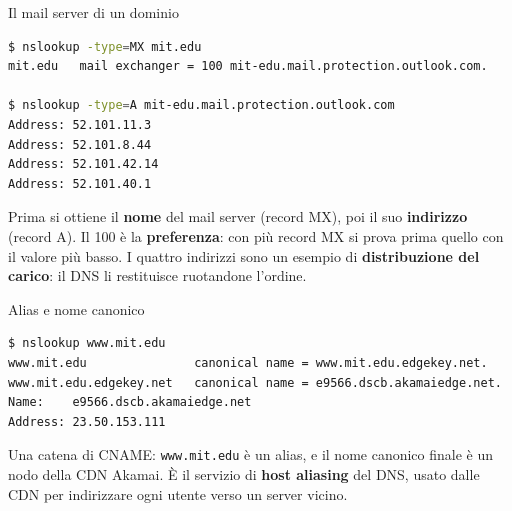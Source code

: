 
\begin{esempio}{Il mail server di un dominio}
\begin{lstlisting}[language=bash]
$ nslookup -type=MX mit.edu
mit.edu   mail exchanger = 100 mit-edu.mail.protection.outlook.com.

$ nslookup -type=A mit-edu.mail.protection.outlook.com
Address: 52.101.11.3
Address: 52.101.8.44
Address: 52.101.42.14
Address: 52.101.40.1
\end{lstlisting}
Prima si ottiene il \textbf{nome} del mail server (record MX), poi il suo \textbf{indirizzo} (record A). Il 100 è la
\textbf{preferenza}: con più record MX si prova prima quello con il valore più basso. I quattro indirizzi sono un esempio di
\textbf{distribuzione del carico}: il DNS li restituisce ruotandone l'ordine.
\end{esempio}

\begin{esempio}{Alias e nome canonico}
\begin{lstlisting}[language=bash]
$ nslookup www.mit.edu
www.mit.edu               canonical name = www.mit.edu.edgekey.net.
www.mit.edu.edgekey.net   canonical name = e9566.dscb.akamaiedge.net.
Name:    e9566.dscb.akamaiedge.net
Address: 23.50.153.111
\end{lstlisting}
Una catena di CNAME: \texttt{www.mit.edu} è un alias, e il nome canonico finale è un nodo della CDN Akamai. È il servizio di
\textbf{host aliasing} del DNS, usato dalle CDN per indirizzare ogni utente verso un server vicino.
\end{esempio}

